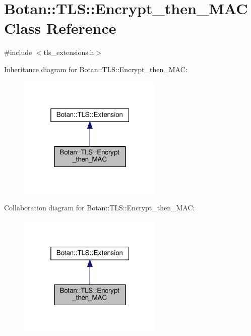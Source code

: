 \hypertarget{class_botan_1_1_t_l_s_1_1_encrypt__then___m_a_c}{}\section{Botan\+:\+:T\+LS\+:\+:Encrypt\+\_\+then\+\_\+\+M\+AC Class Reference}
\label{class_botan_1_1_t_l_s_1_1_encrypt__then___m_a_c}


{\ttfamily \#include $<$tls\+\_\+extensions.\+h$>$}



Inheritance diagram for Botan\+:\+:T\+LS\+:\+:Encrypt\+\_\+then\+\_\+\+M\+AC\+:
\nopagebreak
\begin{figure}[H]
\begin{center}
\leavevmode
\includegraphics[width=196pt]{class_botan_1_1_t_l_s_1_1_encrypt__then___m_a_c__inherit__graph}
\end{center}
\end{figure}


Collaboration diagram for Botan\+:\+:T\+LS\+:\+:Encrypt\+\_\+then\+\_\+\+M\+AC\+:
\nopagebreak
\begin{figure}[H]
\begin{center}
\leavevmode
\includegraphics[width=196pt]{class_botan_1_1_t_l_s_1_1_encrypt__then___m_a_c__coll__graph}
\end{center}
\end{figure}
